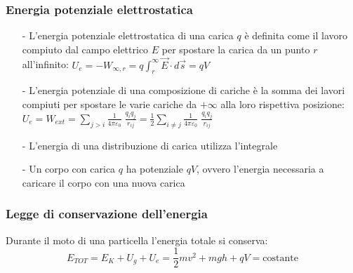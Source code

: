 \documentclass[a4paper]{article}
\begin{document}
\subsubsection*{Energia potenziale elettrostatica}
\begin{itemize}
	\item[-] L'energia potenziale elettrostatica di una carica \(q\) è definita come il lavoro compiuto dal campo elettrico \(E\) per spostare
	la carica da un punto \(r\) all'infinito: \(\displaystyle U_e = - W_{\infty,r} =  q \int_r^{\infty} \vec{E} \cdot d\vec{s} = qV\)
	
	\item[-] L'energia potenziale di una composizione di cariche è la somma dei lavori compiuti per spostare le varie cariche da \(+\infty\)
	alla loro rispettiva posizione: \(\displaystyle U_e = W_{ext} = \sum_{j>i} \frac{1}{4 \pi \varepsilon_0} \; \frac{q_i q_j}{r_{ij}} = \frac{1}{2} \sum_{i \neq j} \frac{1}{4 \pi \varepsilon_0} \; \frac{q_i q_j}{r_{ij}}\)

	\item[-] L'energia di una distribuzione di carica utilizza l'integrale
	
	\item[-] Un corpo con carica \(q\) ha potenziale \(qV\), ovvero l'energia necessaria a caricare il corpo con una nuova carica
\end{itemize}

\subsubsection*{Legge di conservazione dell'energia}
Durante il moto di una particella l'energia totale si conserva:
\[E_{TOT} = E_K + U_g + U_e = \frac{1}{2} mv^2 + mgh + qV = \text{costante}\]
\end{document}
